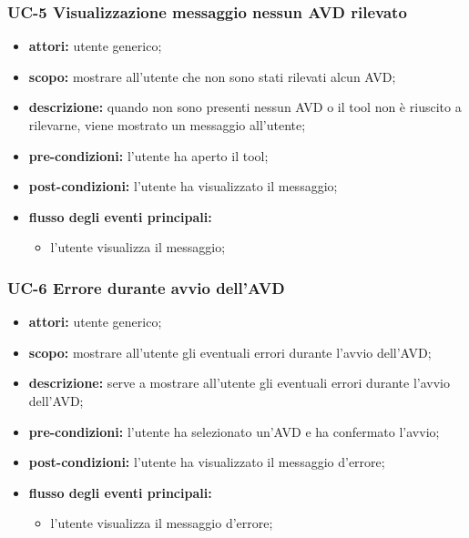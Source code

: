 \subsubsection{UC-5 Visualizzazione messaggio nessun AVD rilevato} \label{subsubsec:uc-5-visualizzazione-messaggio-nessun-avd-rilevato}
\begin{itemize}
    \item \textbf{attori:} utente generico;
    \item \textbf{scopo:} mostrare all'utente che non sono stati rilevati alcun AVD;
    \item \textbf{descrizione:} quando non sono presenti nessun AVD o il tool non è riuscito a rilevarne, viene mostrato un messaggio all'utente;
    \item \textbf{pre-condizioni:} l'utente ha aperto il tool;
    \item \textbf{post-condizioni:} l'utente ha visualizzato il messaggio;
    \item \textbf{flusso degli eventi principali:}
    \begin{itemize}
        \item l'utente visualizza il messaggio;
    \end{itemize}
\end{itemize}
\subsubsection{UC-6 Errore durante avvio dell'AVD}\label{subsubsec:uc-6-errore-durante-avvio-dell'avd}
\begin{itemize}
    \item \textbf{attori:} utente generico;
    \item \textbf{scopo:} mostrare all'utente gli eventuali errori durante l'avvio dell'AVD;
    \item \textbf{descrizione:} serve a mostrare all'utente gli eventuali errori durante l'avvio dell'AVD;
    \item \textbf{pre-condizioni:} l'utente ha selezionato un'AVD e ha confermato l'avvio;
    \item \textbf{post-condizioni:} l'utente ha visualizzato il messaggio d'errore;
    \item \textbf{flusso degli eventi principali:}
    \begin{itemize}
        \item l'utente visualizza il messaggio d'errore;
    \end{itemize}
\end{itemize}
